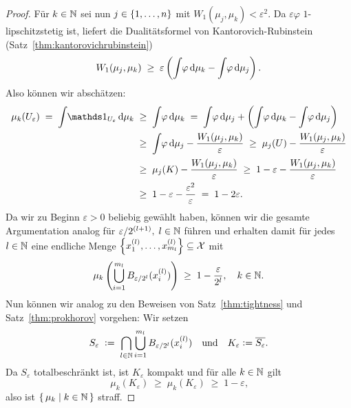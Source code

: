 \documentclass[../main/main.tex]{subfiles}
\begin{document}
\begin{proof}
		Für  $k \in \mathbb{N}$ sei nun $j \in \left\{1, \dots, n\right\}$ mit $W_1(\mu_j, \mu_k) < \varepsilon^2$. Da $\varepsilon\varphi$ $1$-lipschitzstetig ist, liefert die 
		Dualitätsformel von Kantorovich-Rubinstein (Satz~\ref{thm:kantorovichrubinstein})
		\[ W_1(\mu_j, \mu_k) \; \geq \; \varepsilon \left( \int_{} \, \varphi \, \mathrm{d}\mu_k - \int_{} \, \varphi \, \mathrm{d}\mu_j \right) \text{.} \]
		Also können wir abschätzen:
		\begin{align*}
			\mu_k(U_\varepsilon) \; = \; \measureint{}{\indfct_{U_\varepsilon}}{\mu_k} \; &\geq \; \measureint{}{\varphi}{\mu_k} \; = \; \measureint{}{\varphi}{\mu_j} + \left( \measureint{}{\varphi}{\mu_k} - \measureint{}{\varphi}{\mu_j} \right) \\
			                                                                              &\geq \; \measureint{}{\varphi}{\mu_j} - \frac{W_1(\mu_j, \mu_k)}{\varepsilon} \; \geq \; \mu_j(U) - \frac{W_1(\mu_j, \mu_k)}{\varepsilon} \\
			                                                                              &\geq \; \mu_j(K) - \frac{W_1(\mu_j, \mu_k)}{\varepsilon} \; \geq \; 1 - \varepsilon - \frac{W_1(\mu_j, \mu_k)}{\varepsilon} \\
			                                                                              &\geq \; 1 - \varepsilon - \frac{\varepsilon^2}{\varepsilon} \; = \; 1 - 2\varepsilon \text{.}
		\end{align*}
		Da wir zu Beginn $\varepsilon > 0$ beliebig gewählt haben, können wir die gesamte Argumentation analog für $\varepsilon/2^{(l+1)}, \; l \in \mathbb{N}$ führen und erhalten damit für jedes $l \in \mathbb{N}$ 
		eine endliche Menge $\left\{x_1^{(l)}, \dots, x_{m_l}^{(l)}\right\} \subseteq \mathcal{X}$ mit
		\[ \mu_k \left( \bigcup_{i=1}^{m_l} B_{\varepsilon/2^l}(x_i^{(l)}) \right) \; \geq \; 1 - \frac{\varepsilon}{2^l}, \quad k \in \mathbb{N} \text{.} \]
		Nun können wir analog zu den Beweisen von Satz~\ref{thm:tightness} und Satz~\ref{thm:prokhorov} vorgehen:
		Wir setzen
		\[ S_{\varepsilon} \; \vcentcolon = \; \bigcap_{l \in \mathbb{N}} \bigcup_{i=1}^{m_l} B_{\varepsilon/2^l}(x_i^{(l)}) \quad \text{und} \quad K_{\varepsilon} \vcentcolon = \overline{S_\varepsilon} \text{.} \]
		Da $S_{\varepsilon}$ totalbeschränkt ist, ist $K_{\varepsilon}$ kompakt und für alle $k \in \mathbb{N}$ gilt
		\[ \mu_k(K_{\varepsilon}) \; \geq \; \mu_k(K_{\varepsilon}) \; \geq \; 1 - \varepsilon \text{,} \]
		also ist $\left\{\, \mu_k \; \middle| \; k \in \mathbb{N} \,\right\}$ straff.
	\end{proof}
\end{document}
